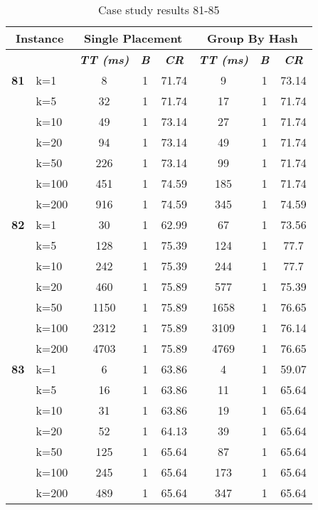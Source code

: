     \begin{table}[htbp]
    \caption{Case study results 81-85}
    \centering
    \begin{tabular}{|l|l|c|c|c|c|c|c|}
    \hline
    \multicolumn{ 2}{|c|}{\textbf{Instance}} & \multicolumn{ 3}{c|}{\textbf{Single Placement}} & \multicolumn{ 3}{c|}{\textbf{Group By Hash}} \\ \hline
    \multicolumn{ 2}{|l|}{} & \textbf{\textit{TT (ms)}} & \textbf{\textit{B}} & \textbf{\textit{CR}} & \textbf{\textit{TT (ms)}} & \textbf{\textit{B}} & \textbf{\textit{CR}} \\ \hline
    \multicolumn{1}{|r|}{\textbf{81}} & k=1 & 8 & 1 & 71.74 & 9 & 1 & 73.14 \\ 
     & k=5 & 32 & 1 & 71.74 & 17 & 1 & 71.74 \\ 
     & k=10 & 49 & 1 & 73.14 & 27 & 1 & 71.74 \\ 
     & k=20 & 94 & 1 & 73.14 & 49 & 1 & 71.74 \\ 
     & k=50 & 226 & 1 & 73.14 & 99 & 1 & 71.74 \\ 
     & k=100 & 451 & 1 & 74.59 & 185 & 1 & 71.74 \\ 
     & k=200 & 916 & 1 & 74.59 & 345 & 1 & 74.59 \\ \hline
    \multicolumn{1}{|r|}{\textbf{82}} & k=1 & 30 & 1 & 62.99 & 67 & 1 & 73.56 \\ 
     & k=5 & 128 & 1 & 75.39 & 124 & 1 & 77.7 \\ 
     & k=10 & 242 & 1 & 75.39 & 244 & 1 & 77.7 \\ 
     & k=20 & 460 & 1 & 75.89 & 577 & 1 & 75.39 \\ 
     & k=50 & 1150 & 1 & 75.89 & 1658 & 1 & 76.65 \\ 
     & k=100 & 2312 & 1 & 75.89 & 3109 & 1 & 76.14 \\ 
     & k=200 & 4703 & 1 & 75.89 & 4769 & 1 & 76.65 \\ \hline
    \multicolumn{1}{|r|}{\textbf{83}} & k=1 & 6 & 1 & 63.86 & 4 & 1 & 59.07 \\ 
     & k=5 & 16 & 1 & 63.86 & 11 & 1 & 65.64 \\ 
     & k=10 & 31 & 1 & 63.86 & 19 & 1 & 65.64 \\ 
     & k=20 & 52 & 1 & 64.13 & 39 & 1 & 65.64 \\ 
     & k=50 & 125 & 1 & 65.64 & 87 & 1 & 65.64 \\ 
     & k=100 & 245 & 1 & 65.64 & 173 & 1 & 65.64 \\ 
     & k=200 & 489 & 1 & 65.64 & 347 & 1 & 65.64 \\ \hline

\end{tabular}
\end{table}
